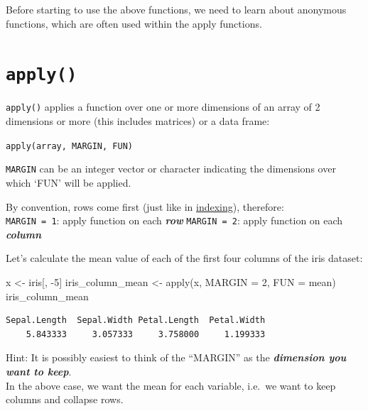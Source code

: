 \documentclass[
]{book}
\newenvironment{Shaded}{\begin{snugshade}}{\end{snugshade}}
\newcommand{\AttributeTok}[1]{\textcolor[rgb]{0.77,0.63,0.00}{#1}}
\newcommand{\DecValTok}[1]{\textcolor[rgb]{0.00,0.00,0.81}{#1}}
\newcommand{\FunctionTok}[1]{\textcolor[rgb]{0.00,0.00,0.00}{#1}}
\newcommand{\NormalTok}[1]{#1}
\newcommand{\OtherTok}[1]{\textcolor[rgb]{0.56,0.35,0.01}{#1}}
\newcommand{\SpecialCharTok}[1]{\textcolor[rgb]{0.00,0.00,0.00}{#1}}
\begin{document}
Before starting to use the above functions, we need to learn about anonymous functions, which are often used within the apply functions.

\hypertarget{apply}{%
\section{\texorpdfstring{\texttt{apply()}}{apply()}}\label{apply}}

\begin{rmdtip}
\texttt{apply()} applies a function over one or more dimensions of an
array of 2 dimensions or more (this includes matrices) or a data frame:

\texttt{apply(array,\ MARGIN,\ FUN)}
\end{rmdtip}

\texttt{MARGIN} can be an integer vector or character indicating the dimensions over which `FUN' will be applied.

By convention, rows come first (just like in \protect\hyperlink{indexing}{indexing}), therefore:\\
\texttt{MARGIN\ =\ 1}: apply function on each \textbf{\emph{row}}
\texttt{MARGIN\ =\ 2}: apply function on each \textbf{\emph{column}}

Let's calculate the mean value of each of the first four columns of the iris dataset:

\begin{Shaded}
\begin{Highlighting}[]
\NormalTok{x }\OtherTok{\textless{}{-}}\NormalTok{ iris[, }\SpecialCharTok{{-}}\DecValTok{5}\NormalTok{]}
\NormalTok{iris\_column\_mean }\OtherTok{\textless{}{-}} \FunctionTok{apply}\NormalTok{(x, }\AttributeTok{MARGIN =} \DecValTok{2}\NormalTok{, }\AttributeTok{FUN =}\NormalTok{ mean) }
\NormalTok{iris\_column\_mean}
\end{Highlighting}
\end{Shaded}

\begin{verbatim}
Sepal.Length  Sepal.Width Petal.Length  Petal.Width 
    5.843333     3.057333     3.758000     1.199333 
\end{verbatim}

\begin{rmdnote}
Hint: It is possibly easiest to think of the ``MARGIN'' as the
\textbf{\emph{dimension you want to keep}}.\\
In the above case, we want the mean for each variable, i.e.~we want to
keep columns and collapse rows.
\end{rmdnote}
\end{document}
